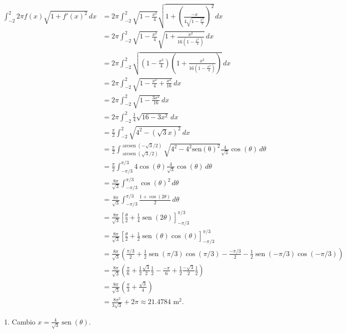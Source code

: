 \documentclass[
  spanish,
  a4paper,
]{scrreport}
\providecommand{\tightlist}{%
  \setlength{\itemsep}{0pt}\setlength{\parskip}{0pt}}
\theoremstyle{definition}
\theoremstyle{remark}
\begin{document}
\begin{tcolorbox}
\begin{align*}
\int_{-2}^2 2\pi f(x) \sqrt{1+f'(x)^2}\,dx
&= 2\pi \int_{-2}^2 \sqrt{1-\frac{x^2}{4}}\sqrt{1+ \left(\frac{-x}{4\sqrt{1-\frac{x^2}{4}}}\right)^2}\,dx \\
&= 2\pi \int_{-2}^2 \sqrt{1-\frac{x^2}{4}}\sqrt{1+ \frac{x^2}{16\left(1-\frac{x^2}{4}\right)}}\,dx \\
&= 2\pi \int_{-2}^2 \sqrt{\left(1-\frac{x^2}{4}\right)\left(1+ \frac{x^2}{16\left(1-\frac{x^2}{4}\right)}\right)}\,dx \\
&= 2\pi \int_{-2}^2 \sqrt{1-\frac{x^2}{4}+\frac{x^2}{16}}\,dx \\
&= 2\pi \int_{-2}^2 \sqrt{1-\frac{3x^2}{16}}\,dx \\
&= 2\pi \int_{-2}^2 \frac{1}{4}\sqrt{16-3x^2}\,dx \\
&= \frac{\pi}{2} \int_{-2}^2 \sqrt{4^2-(\sqrt{3}x)^2}\,dx \\
&= \frac{\pi}{2} \int_{\operatorname{arcsen}(\sqrt{3}/2)}^{\operatorname{arcsen}(-\sqrt{3}/2)} \sqrt{4^2-4^2\operatorname{sen(\theta)^2}}\frac{4}{\sqrt{3}}\cos(\theta)\,d\theta \tag{1} \\
&= \frac{\pi}{2} \int_{-\pi/3}^{\pi/3} 4\cos(\theta)\frac{4}{\sqrt{3}}\cos(\theta)\,d\theta \\
&= \frac{8\pi}{\sqrt{3}} \int_{-\pi/3}^{\pi/3} \cos(\theta)^2\,d\theta \\
&= \frac{8\pi}{\sqrt{3}} \int_{-\pi/3}^{\pi/3} \frac{1+\cos(2\theta)}{2}\,d\theta \\
&= \frac{8\pi}{\sqrt{3}}\left[\frac{\theta}{2}+\frac{1}{4}\operatorname{sen}(2\theta)\right]_{-\pi/3}^{\pi/3} \\
&= \frac{8\pi}{\sqrt{3}}\left[\frac{\theta}{2}+\frac{1}{2}\operatorname{sen}(\theta)\cos(\theta)\right]_{-\pi/3}^{\pi/3} \\
&= \frac{8\pi}{\sqrt{3}}\left(\frac{\pi/3}{2}+\frac{1}{2}\operatorname{sen}(\pi/3)\cos(\pi/3) - \frac{-\pi/3}{2}-\frac{1}{2}\operatorname{sen}(-\pi/3)\cos(-\pi/3)\right) \\
&=\frac{8\pi}{\sqrt{3}}\left(\frac{\pi}{6}+\frac{1}{2}\frac{\sqrt{3}}{2}\frac{1}{2} - \frac{-\pi}{6} + \frac{1}{2}\frac{-\sqrt{3}}{2}\frac{1}{2}\right)\\
&=\frac{8\pi}{\sqrt{3}}\left(\frac{\pi}{3}+\frac{\sqrt{3}}{4}\right)\\
&= \frac{8\pi^2}{3\sqrt{3}} + 2\pi
\approx 21.4784  \mbox{ m}^2.
\end{align*}

\begin{enumerate}
\def\labelenumi{(\arabic{enumi})}
\tightlist
\item
  Cambio \(x = \frac{4}{\sqrt{3}}\operatorname{sen}(\theta)\).
\end{enumerate}

\end{tcolorbox}
\end{document}
